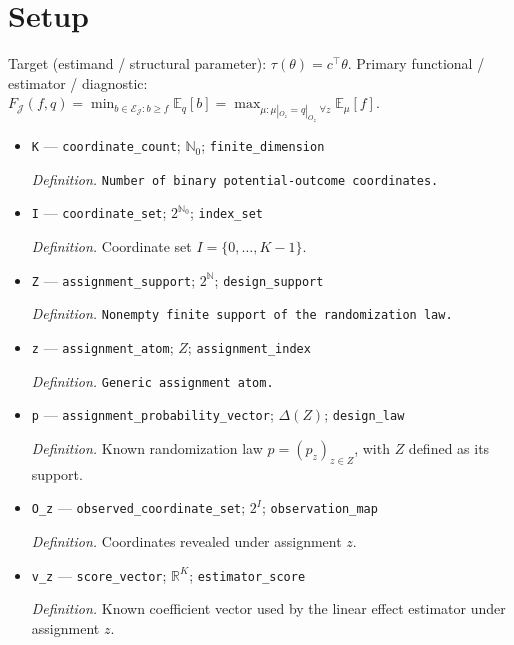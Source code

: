 \documentclass{article}
\begin{document}
\section{Setup}

Target (estimand / structural parameter): \(\tau(\theta)=c^\top\theta\).
Primary functional / estimator / diagnostic: \(F_{\mathcal J}(f,q)=\min_{b\in\mathcal E_{\mathcal J}:b\ge f}\mathbb E_q[b]=\max_{\mu:\mu|_{O_z}=q|_{O_z}\;\forall z}\mathbb E_\mu[f]\).
\begin{itemize}
  \item \texttt{K} --- \texttt{coordinate\_\allowbreak{}count}; \(\mathbb N_0\); \texttt{finite\_\allowbreak{}dimension}
  \par\smallskip\noindent\emph{Definition.} \texttt{Number of binary potential-\allowbreak{}outcome coordinates.}
  \item \texttt{I} --- \texttt{coordinate\_\allowbreak{}set}; \(2^{\mathbb N_0}\); \texttt{index\_\allowbreak{}set}
  \par\smallskip\noindent\emph{Definition.} Coordinate set \(I=\{0,\ldots,K-1\}\).
  \item \texttt{Z} --- \texttt{assignment\_\allowbreak{}support}; \(2^{\mathbb N}\); \texttt{design\_\allowbreak{}support}
  \par\smallskip\noindent\emph{Definition.} \texttt{Nonempty finite support of the randomization law.}
  \item \texttt{z} --- \texttt{assignment\_\allowbreak{}atom}; \(Z\); \texttt{assignment\_\allowbreak{}index}
  \par\smallskip\noindent\emph{Definition.} \texttt{Generic assignment atom.}
  \item \texttt{p} --- \texttt{assignment\_\allowbreak{}probability\_\allowbreak{}vector}; \(\Delta(Z)\); \texttt{design\_\allowbreak{}law}
  \par\smallskip\noindent\emph{Definition.} Known randomization law \(p=(p_z)_{z\in Z}\), with \(Z\) defined as its support.
  \item \texttt{O\_\allowbreak{}z} --- \texttt{observed\_\allowbreak{}coordinate\_\allowbreak{}set}; \(2^I\); \texttt{observation\_\allowbreak{}map}
  \par\smallskip\noindent\emph{Definition.} Coordinates revealed under assignment \(z\).
  \item \texttt{v\_\allowbreak{}z} --- \texttt{score\_\allowbreak{}vector}; \(\mathbb R^K\); \texttt{estimator\_\allowbreak{}score}
  \par\smallskip\noindent\emph{Definition.} Known coefficient vector used by the linear effect estimator under assignment \(z\).

\end{itemize}
\end{document}
